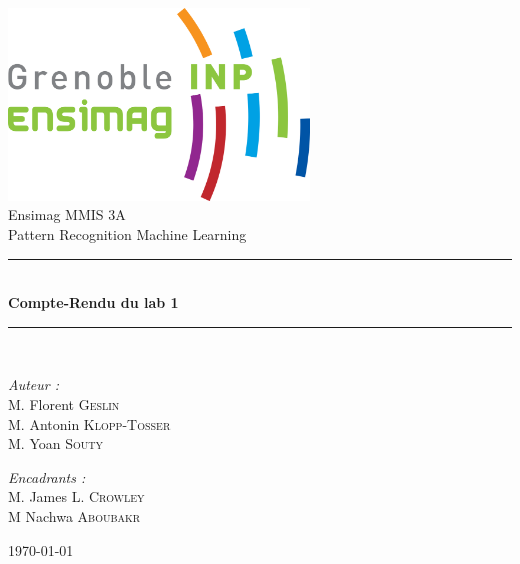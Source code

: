 \documentclass[a4paper,12pt, openany]{book}
\theoremstyle{break}
\begin{document}

\begin{titlepage}
\begin{center}

\includegraphics[width=0.6\textwidth]{ensimag_logo.png}\\[1cm]

{\large Ensimag MMIS 3A}\\[0.5cm]

{\large Pattern Recognition Machine Learning }\\[0.5cm]

\rule{\linewidth}{0.5mm} \\[0.4cm]
{ \huge \bfseries Compte-Rendu du lab 1\\[0.4cm] }
\rule{\linewidth}{0.5mm} \\[1.5cm]

\noindent
\begin{minipage}{0.4\textwidth}
  \begin{flushleft} \large
    \emph{Auteur :}\\
    M. Florent \textsc{Geslin} \\
    M. Antonin \textsc{Klopp-Tosser} \\
    M. Yoan \textsc{Souty} \\
  \end{flushleft}
\end{minipage}%
\begin{minipage}{0.4\textwidth}
  \begin{flushright} \large
    \emph{Encadrants :} \\
    M. James L. \textsc{Crowley}\\
    M Nachwa \textsc{Aboubakr} \\

  \end{flushright}
\end{minipage}

\vfill

{\large \today}

\end{center}
\end{titlepage}
\end{document}
